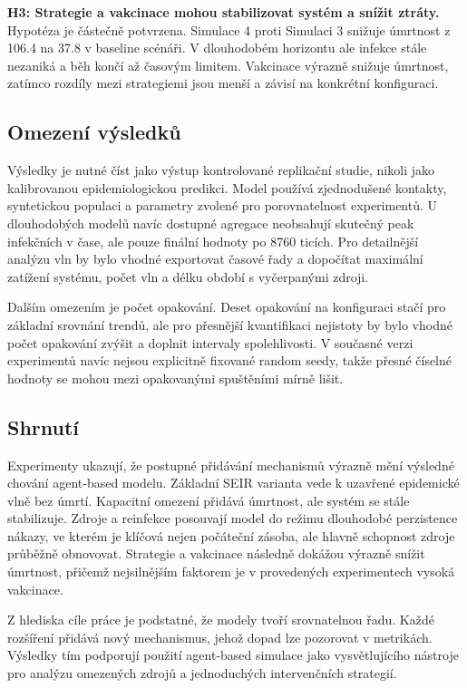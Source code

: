 \documentclass{article}
\begin{document}
\textbf{H3: Strategie a vakcinace mohou stabilizovat systém a snížit ztráty.}
Hypotéza je částečně potvrzena. Simulace 4 proti Simulaci 3 snižuje úmrtnost
z 106.4 na 37.8 v baseline scénáři. V dlouhodobém horizontu ale infekce stále
nezaniká a běh končí až časovým limitem. Vakcinace výrazně snižuje úmrtnost,
zatímco rozdíly mezi strategiemi jsou menší a závisí na konkrétní konfiguraci.

\subsection{Omezení výsledků}

Výsledky je nutné číst jako výstup kontrolované replikační studie, nikoli jako
kalibrovanou epidemiologickou predikci. Model používá zjednodušené kontakty,
syntetickou populaci a parametry zvolené pro porovnatelnost experimentů. U
dlouhodobých modelů navíc dostupné agregace neobsahují skutečný peak infekčních
v čase, ale pouze finální hodnoty po 8760 ticích. Pro detailnější analýzu vln by
bylo vhodné exportovat časové řady a dopočítat maximální zatížení systému,
počet vln a délku období s vyčerpanými zdroji.

Dalším omezením je počet opakování. Deset opakování na konfiguraci stačí pro
základní srovnání trendů, ale pro přesnější kvantifikaci nejistoty by bylo
vhodné počet opakování zvýšit a doplnit intervaly spolehlivosti. V současné
verzi experimentů navíc nejsou explicitně fixované random seedy, takže přesné
číselné hodnoty se mohou mezi opakovanými spuštěními mírně lišit.

\subsection{Shrnutí}

Experimenty ukazují, že postupné přidávání mechanismů výrazně mění výsledné
chování agent-based modelu. Základní SEIR varianta vede k uzavřené epidemické
vlně bez úmrtí. Kapacitní omezení přidává úmrtnost, ale systém se stále
stabilizuje. Zdroje a reinfekce posouvají model do režimu dlouhodobé perzistence
nákazy, ve kterém je klíčová nejen počáteční zásoba, ale hlavně schopnost zdroje
průběžně obnovovat. Strategie a vakcinace následně dokážou výrazně snížit
úmrtnost, přičemž nejsilnějším faktorem je v provedených experimentech vysoká
vakcinace.

Z hlediska cíle práce je podstatné, že modely tvoří srovnatelnou řadu. Každé
rozšíření přidává nový mechanismus, jehož dopad lze pozorovat v metrikách.
Výsledky tím podporují použití agent-based simulace jako vysvětlujícího nástroje
pro analýzu omezených zdrojů a jednoduchých intervenčních strategií.
\end{document}
